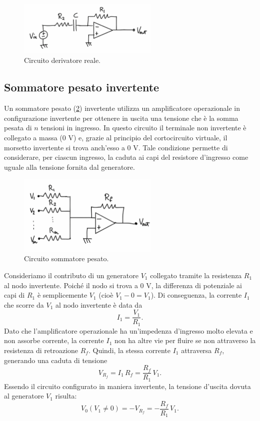\begin{figure}[H]
    \centering
    \includegraphics[width=0.6\textwidth]{images/1.3.2.3.png}
    \caption{Circuito derivatore reale.}
    \label{fig:derivatore_reale}
\end{figure}

\newpage

\subsection{Sommatore pesato invertente}

Un sommatore pesato (\ref{fig:sommatore}) invertente utilizza un amplificatore operazionale in configurazione invertente per ottenere in uscita una tensione che è la somma pesata di \( n \) tensioni in ingresso. In questo circuito il terminale non invertente è collegato a massa (0 V) e, grazie al principio del cortocircuito virtuale, il morsetto invertente si trova anch’esso a 0 V. Tale condizione permette di considerare, per ciascun ingresso, la caduta ai capi del resistore d’ingresso come uguale alla tensione fornita dal generatore.

\begin{figure}[H]
    \centering
    \includegraphics[width=0.6\textwidth]{images/1.3.3.1.png}
    \caption{Circuito sommatore pesato.}
    \label{fig:sommatore}
\end{figure}

Consideriamo il contributo di un generatore \( V_1 \) collegato tramite la resistenza \( R_1 \) al nodo invertente. Poiché il nodo si trova a 0 V, la differenza di potenziale ai capi di \( R_1 \) è semplicemente \( V_1 \) (cioè \( V_1 - 0 = V_1 \)). Di conseguenza, la corrente \( I_1 \) che scorre da \( V_1 \) al nodo invertente è data da
\[
I_1 = \frac{V_1}{R_1}.
\]
Dato che l’amplificatore operazionale ha un’impedenza d’ingresso molto elevata e non assorbe corrente, la corrente \( I_1 \) non ha altre vie per fluire se non attraverso la resistenza di retroazione \( R_f \). Quindi, la stessa corrente \( I_1 \) attraversa \( R_f \), generando una caduta di tensione
\[
V_{R_f} = I_1 \, R_f = \frac{R_f}{R_1}\, V_1.
\]
Essendo il circuito configurato in maniera invertente, la tensione d’uscita dovuta al generatore \( V_1 \) risulta:
\[
V_0(V_1 \neq 0) = - V_{R_f} = -\frac{R_f}{R_1}\, V_1.
\]

